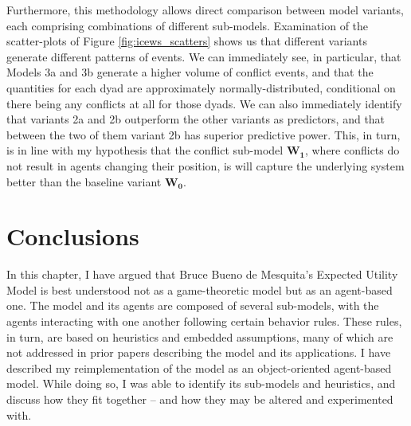 Furthermore, this methodology allows direct comparison between model variants, each comprising combinations of different sub-models. Examination of the scatter-plots of Figure \ref{fig:icews_scatters} shows us that different variants generate different patterns of events. We can immediately see, in particular, that Models 3a and 3b generate a higher volume of conflict events, and that the quantities for each dyad are approximately normally-distributed, conditional on there being any conflicts at all for those dyads. We can also immediately identify that variants 2a and 2b outperform the other variants as predictors, and that between the two of them variant 2b has superior predictive power. This, in turn, is in line with my hypothesis that the conflict sub-model $\mathbf{W_1}$, where conflicts do not result in agents changing their position, is will capture the underlying system better than the baseline variant $\mathbf{W_0}$.

\section{Conclusions}

In this chapter, I have argued that Bruce Bueno de Mesquita's Expected Utility Model is best understood not as a game-theoretic model but as an agent-based one. The model and its agents are composed of several sub-models, with the agents interacting with one another following certain behavior rules. These rules, in turn, are based on heuristics and embedded assumptions, many of which are not addressed in prior papers describing the model and its applications. I have described my reimplementation of the model as an object-oriented agent-based model. While doing so, I was able to identify its sub-models and heuristics, and discuss how they fit together -- and how they may be altered and experimented with.

